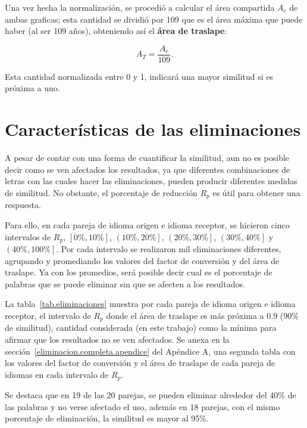 Una vez hecha la normalización, se procedió a calcular el área compartida  $A_{c}$ de ambas graficas; esta cantidad se dividió por 109 que es el área máxima que puede haber (al ser 109 años), obteniendo así el \textbf{área de traslape}:

\begin{equation}
A_{T} = \frac{A_{c}}{109}.
\label{ec.atraslape}
\end{equation}

Esta cantidad normalizada entre 0 y 1, indicará una mayor similitud si es próxima a uno.

\section{Características de las eliminaciones}

A pesar de contar con una forma de cuantificar la similitud, aun no es posible decir como se ven afectados los resultados, ya que diferentes combinaciones de letras con las cuales hacer las eliminaciones, pueden producir diferentes medidas de similitud.  No obstante, el porcentaje de reducción $R_{p}$ es útil para obtener una respuesta.

Para ello, en cada pareja de idioma origen e idioma receptor, se hicieron cinco intervalos de $R_{p}$, $\left[0\%, 10\% \right]$, $\left( 10\%, 20\% \right]$, $\left( 20\%, 30\% \right]$, $\left( 30\%, 40\% \right]$ y $\left( 40\%, 100\% \right]$. Por cada intervalo se realizaron mil eliminaciones diferentes, agrupando y promediando los valores del factor de conversión y del área de traslape.  Ya con los promedios, será posible decir cual es el porcentaje de palabras que se puede eliminar sin que se afecten a los resultados. 

La tabla~\ref{tab.eliminaciones} muestra por cada pareja de idioma origen e idioma receptor, el intervalo de $R_{p}$ donde el área de traslape es más próxima a 0.9 (90$\%$ de similitud), cantidad considerada (en este trabajo) como la mínima para afirmar que los resultados no se ven afectados.  Se anexa en la sección~\ref{eliminacion.completa.apendice} del Apéndice A, una segunda tabla con los valores del factor de conversión y el área de traslape de cada pareja de idiomas en cada intervalo de $R_{p}$.

Se destaca que en 19 de las 20 parejas, se pueden eliminar alrededor del $40\%$ de las palabras y
no verse afectado el uso, además en 18 parejas, con el mismo porcentaje de eliminación, la similitud es mayor al 95$\%$. 

